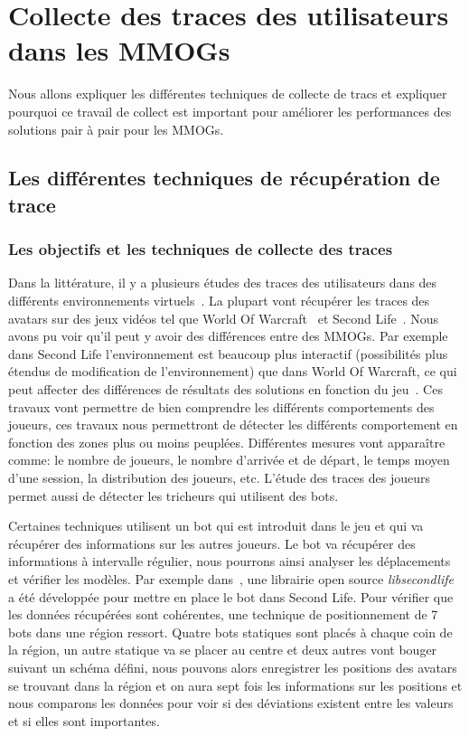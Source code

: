 \newpage
\section{Collecte des traces des utilisateurs dans les MMOGs}
	\label{trace}
	Nous allons expliquer les différentes techniques de collecte de tracs et expliquer pourquoi ce travail de collect est important pour améliorer les performances des solutions pair à pair pour les MMOGs.
	\subsection{Les différentes techniques de récupération de trace}
		\subsubsection{Les objectifs et les techniques de collecte des traces}
		\par Dans la littérature, il y a plusieurs études des traces des utilisateurs dans des différents environnements virtuels~\cite{1326262,0295-5075-88-4-48007}. La plupart vont récupérer les traces des avatars sur des jeux vidéos tel que World Of Warcraft~\cite{wow} et Second Life~\cite{sl}. Nous avons pu voir qu'il peut y avoir des différences entre des MMOGs. Par exemple dans Second Life l'environnement est beaucoup plus interactif (possibilités plus étendus de modification de l'environnement) que dans World Of Warcraft, ce qui peut affecter des différences de résultats des solutions en fonction du jeu~\cite{DBLP:journals/corr/abs-0807-2328,1613041}. Ces travaux vont permettre de bien comprendre les différents comportements des joueurs, ces travaux nous permettront de détecter les différents comportement en fonction des zones plus ou moins peuplées. Différentes mesures vont apparaître comme: le nombre de joueurs, le nombre d'arrivée et de départ, le temps moyen d'une session, la distribution des joueurs, etc. L'étude des traces des joueurs permet aussi de détecter les tricheurs qui utilisent des bots. \\
	\par Certaines techniques utilisent un bot qui est introduit dans le jeu et qui va récupérer des informations sur les autres joueurs. Le bot va récupérer des informations à intervalle régulier, nous pourrons ainsi analyser les déplacements et vérifier les modèles. Par exemple dans~\cite{DBLP:journals/corr/abs-0807-2328}, une librairie open source \textit{libsecondlife} a été développée pour mettre en place le bot dans Second Life. Pour vérifier que les données récupérées sont cohérentes, une technique de positionnement de 7 bots dans une région ressort. Quatre bots statiques sont placés à chaque coin de la région, un autre statique va se placer au centre et deux autres vont bouger suivant un schéma défini, nous pouvons alors enregistrer les positions des avatars se trouvant dans la région et on aura sept fois les informations sur les positions et nous comparons les données pour voir si des déviations existent entre les valeurs et si elles sont importantes.\\  

